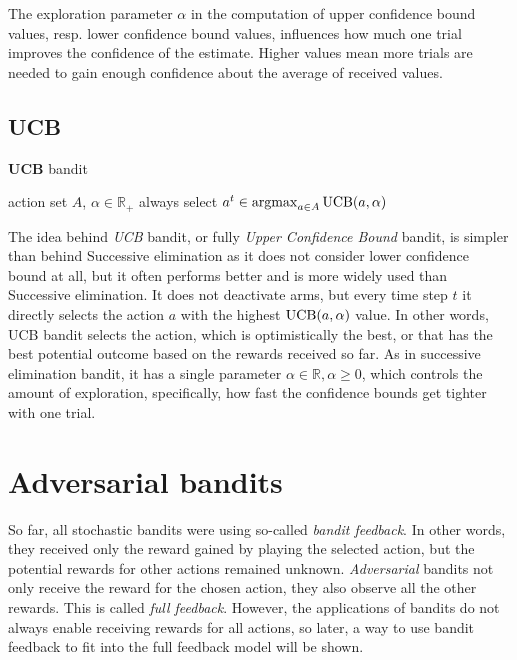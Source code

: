 \documentclass[../main.tex]{subfiles}
\begin{document}
The exploration parameter $\alpha$ in the computation of upper confidence bound values, resp. lower confidence bound values, influences how much one trial improves the confidence of the estimate.
Higher values mean more trials are needed to gain enough confidence about the average of received values.

\subsection{UCB}\label{bandit:stochastic:ucb}
\begin{algorithm}
    \caption{\textbf{UCB} bandit}
    \label{bandit:stochastic:ucb:alg}
    \begin{algorithmic}[1]
        \Require action set $A$, $\alpha \in \mathbb{R}_{+}$
        \State always select $a^t \in \operatorname*{argmax}_{a \in A} \text{UCB}(a, \alpha)$
    \end{algorithmic}
\end{algorithm}
The idea behind \textit{UCB} bandit, or fully \textit{Upper Confidence Bound} bandit, is simpler than behind Successive elimination as it does not consider lower confidence bound at all, but it often performs better and is more widely used than Successive elimination.
It does not deactivate arms, but every time step $t$ it directly selects the action $a$ with the highest $\text{UCB}(a, \alpha)$ value.
In other words, UCB bandit selects the action, which is optimistically the best, or that has the best potential outcome based on the rewards received so far.
As in successive elimination bandit, it has a single parameter $\alpha \in \mathbb{R}, \alpha \geq 0$, which controls the amount of exploration, specifically, how fast the confidence bounds get tighter with one trial.

\section{Adversarial bandits}\label{bandit:adversarial}
So far, all stochastic bandits were using so-called \textit{bandit feedback}.
In other words, they received only the reward gained by playing the selected action, but the potential rewards for other actions remained unknown.
\textit{Adversarial} bandits not only receive the reward for the chosen action, they also observe all the other rewards.
This is called \textit{full feedback}.
However, the applications of bandits do not always enable receiving rewards for all actions, so later, a way to use bandit feedback to fit into the full feedback model will be shown.
\end{document}
